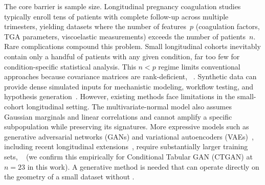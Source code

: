 The core barrier is sample size. Longitudinal pregnancy coagulation studies
typically enroll tens of patients with complete follow-up across multiple trimesters,
yielding datasets where the number of features~$p$ (coagulation factors, TGA
parameters, viscoelastic measurements) exceeds the number of patients~$n$. Rare
complications compound this problem. Small longitudinal cohorts inevitably contain
only a handful of patients with any given condition, far too few for
condition-specific statistical analysis. This $n < p$ regime limits conventional
approaches because covariance matrices are rank-deficient, ~\citep{Hastie2009}. Synthetic data can
provide dense simulated inputs for mechanistic modeling, workflow testing, and hypothesis
generation~\citep{Gonzales2023,Kuhnel2024}.  However, existing methods face
limitations in the small-cohort longitudinal setting. 
The multivariate-normal model also assumes Gaussian marginals and linear correlations and
cannot amplify a specific subpopulation while preserving
its signatures. More expressive models such as generative adversarial networks (GANs) and
variational autoencoders (VAEs)~\citep{Goodfellow2014,Kingma2014,Xu2019CTGAN}, including recent longitudinal
extensions~\citep{Kuhnel2024}, require substantially larger training sets, ~\citep{DeMitri2025} (we confirm this empirically for Conditional Tabular GAN (CTGAN) at
$n{=}23$ in this work). A generative method is needed that can operate
directly on the geometry of a small dataset without .

